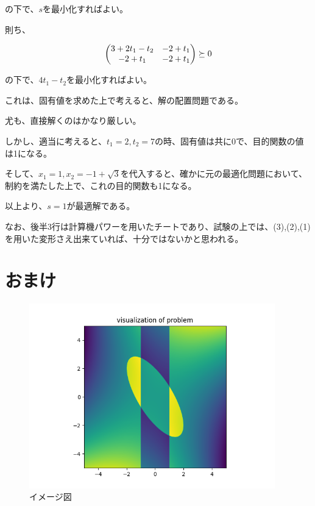 \documentclass[a4paper, 10pt, dvipdfmx]{jlreq}
\begin{document}
の下で、$s$を最小化すればよい。

則ち、

\begin{align*}
  \mqty(
  3+2t_1-t_2 & -2+t_1 \\
  -2+t_1     & -2+t_1
  ) \succeq 0
\end{align*}

の下で、$4t_1-t_2$を最小化すればよい。

これは、固有値を求めた上で考えると、解の配置問題である。

尤も、直接解くのはかなり厳しい。

しかし、適当に考えると、$t_1=2,t_2=7$の時、固有値は共に0で、目的関数の値は1になる。

そして、$x_1=1,x_2=-1+\sqrt{3}$を代入すると、確かに元の最適化問題において、制約を満たした上で、これの目的関数も1になる。

以上より、$s=1$が最適解である。

なお、後半3行は計算機パワーを用いたチートであり、試験の上では、(3),(2),(1)を用いた変形さえ出来ていれば、十分ではないかと思われる。

\section{おまけ}



\begin{figure}[htbp]
  \begin{center}
    \includegraphics[height=80mm]{4_vis.png}
    \caption{イメージ図}
  \end{center}
\end{figure}
\end{document}

